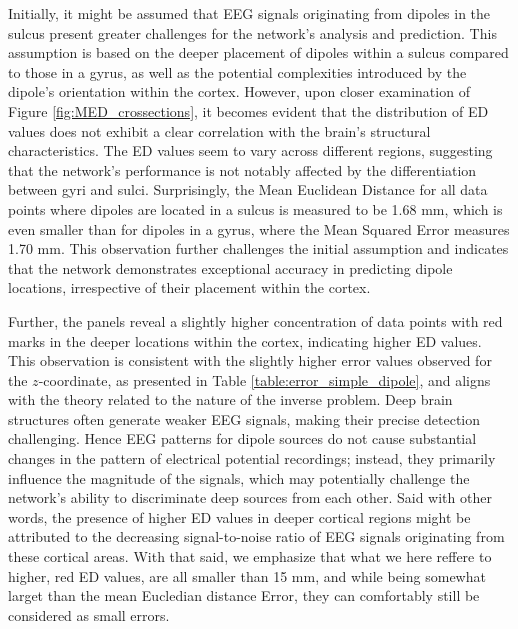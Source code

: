 \documentclass[a4paper, UKenglish, 11pt]{uiomaster}
\begin{document}
Initially, it might be assumed that EEG signals originating from dipoles in the sulcus present greater challenges for the network's analysis and prediction. This assumption is based on the deeper placement of dipoles within a sulcus compared to those in a gyrus, as well as the potential complexities introduced by the dipole's orientation within the cortex. However, upon closer examination of Figure \ref{fig:MED_crossections}, it becomes evident that the distribution of ED values does not exhibit a clear correlation with the brain's structural characteristics. The ED values seem to vary across different regions, suggesting that the network's performance is not notably affected by the differentiation between gyri and sulci. Surprisingly, the Mean Euclidean Distance for all data points where dipoles are located in a sulcus is measured to be 1.68 mm, which is even smaller than for dipoles in a gyrus, where the Mean Squared Error measures 1.70 mm. This observation further challenges the initial assumption and indicates that the network demonstrates exceptional accuracy in predicting dipole locations, irrespective of their placement within the cortex.


Further, the panels reveal a slightly higher concentration of data points with red marks in the deeper locations within the cortex, indicating higher ED values. This observation is consistent with the slightly higher error values observed for the $z$-coordinate, as presented in Table \ref{table:error_simple_dipole}, and aligns with the theory related to the nature of the inverse problem. Deep brain structures often generate weaker EEG signals, making their precise detection challenging. Hence EEG patterns for dipole sources do not cause substantial changes in the pattern of electrical potential recordings; instead, they primarily influence the magnitude of the signals, which may potentially challenge the network's ability to discriminate deep sources from each other. Said with other words, the presence of higher ED values in deeper cortical regions might be attributed to the decreasing signal-to-noise ratio of EEG signals originating from these cortical areas. With that said, we emphasize that what we here reffere to higher, red ED values, are all smaller than 15 mm, and while being somewhat larget than the mean Eucledian distance Error, they can comfortably still be considered as small errors.
\end{document}
